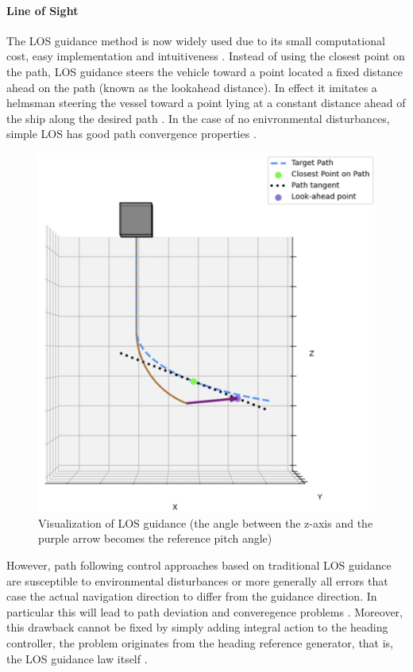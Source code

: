 \paragraph*{Line of Sight}
The LOS guidance method is now widely used due to its small computational cost, easy implementation and intuitiveness \cite{qi_curve_2022} \cite{caharija_integral_2016}. Instead of using the closest point on the path, LOS guidance steers the vehicle toward a point located a fixed distance ahead on the path (known as the lookahead distance). In effect it imitates a helmsman steering the vessel toward a point lying at a constant distance ahead of the ship along the desired path \cite{caharija_integral_2016}. In the case of no enivronmental disturbances, simple LOS has good path convergence properties \cite{borhaug_integral_2008}. 
\begin{figure} [H]
    \centering
    \includegraphics[width=0.7\linewidth]{images/pythonpictures/LOS.png}
    \caption{Visualization of LOS guidance (the angle between the z-axis and the purple arrow becomes the reference pitch angle)}
    \label{fig:LOS}
\end{figure}
However, path following control approaches based on traditional LOS guidance are susceptible to environmental disturbances \cite{borhaug_integral_2008} or more generally all errors that case the actual navigation direction to differ from the guidance direction. In particular this will lead to path deviation and converegence problems \cite{borhaug_integral_2008}. Moreover, this drawback cannot be fixed by simply adding integral action to the heading controller, the problem originates from the heading reference generator, that is, the LOS guidance law itself \cite{borhaug_integral_2008}.

